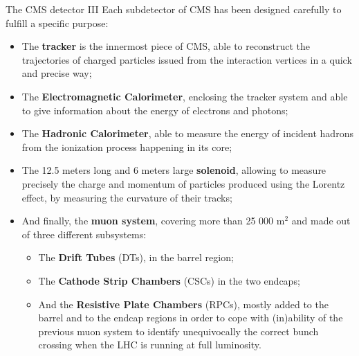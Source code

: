 \documentclass[8pt]{beamer}
\begin{document}
\begin{frame}{The CMS detector III}
\justifying
Each subdetector of CMS has been \alert{designed carefully to fulfill a specific purpose}:

\begin{itemize}
\justifying
\item The \textbf{tracker} is the innermost piece of CMS, able to reconstruct the trajectories of charged particles issued from the interaction vertices in a quick and precise way;
\item The \textbf{Electromagnetic Calorimeter}, enclosing the tracker system and able to give information about the energy of electrons and photons;
\item The \textbf{Hadronic Calorimeter}, able to measure the energy of incident hadrons from the ionization process happening in its core;
\item The 12.5 meters long and 6 meters large \textbf{solenoid}, allowing to measure precisely the charge and momentum of particles produced using the Lorentz effect, by measuring the curvature of their tracks;
\item And finally, the \textbf{muon system}, covering more than 25 000 m$^2$ and made out of three different subsystems:

\begin{itemize}
\justifying
\item The \textbf{Drift Tubes} (DTs), in the barrel region;%
\item The \textbf{Cathode Strip Chambers} (CSCs) in the two endcaps;%
\item And the \textbf{Resistive Plate Chambers} (RPCs), mostly added to the barrel and to the endcap regions in order to cope with (in)ability of  the previous muon system to identify unequivocally the correct bunch crossing when the LHC is running at full luminosity.
\end{itemize}

\end{itemize}
\end{frame}
\end{document}
